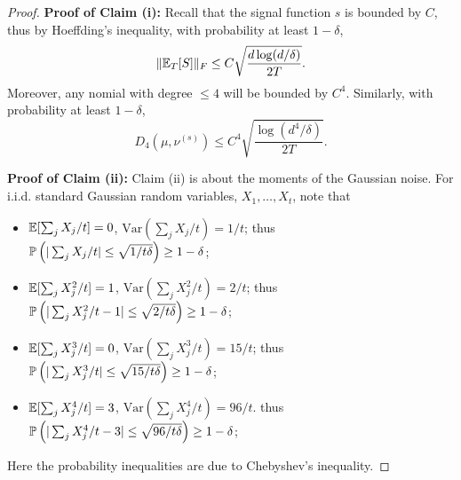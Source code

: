 \begin{proof}
	\vspace{5mm}
	{\bf Proof of Claim (i):} 
	Recall that the signal function $s$ is bounded by $C$, thus by Hoeffding's inequality, with probability at least $1-\delta$, 
	\begin{equation}
	\label{eq:A1claim1a}
	\| \mathbb{E}_T[S] \|_F \le C\sqrt{\frac{d\log(d/\delta)}{2T}}.
	\end{equation} 
	Moreover, any nomial with degree $\le 4$ will be bounded by $C^4$. Similarly, with probability at least $1-\delta$, 
	\begin{equation}
	\label{eq:A1claim1b}
	D_4(\mu, \nu^{(s)}) \le  C^4\sqrt{\frac{\log(d^4/\delta)}{2T}}.
	\end{equation}
	
	\vspace{5mm}
	{\bf Proof of Claim (ii):} 
	Claim (ii) is about the moments of the Gaussian noise. 
	For i.i.d. standard Gaussian random variables, $X_1, \ldots, X_t$, note that
	\begin{itemize}
		\itemsep0em
		\item $ \mathbb{E}[\sum_j X_j/t] = 0$, $\text{Var}(\sum_j X_j/t) = 1/t$; thus  $\mathbb{P}\left( |\sum_j X_j/t| \le \sqrt{1/t\delta} \right) \ge 1-\delta$;
		\item $ \mathbb{E}[\sum_j X_j^2/t] = 1$, $\text{Var}(\sum_j X_j^2/t) = 2/t$; thus  $\mathbb{P}\left( |\sum_j X_j^2/t -1 | \le \sqrt{2/t\delta} \right) \ge 1-\delta$;
		\item $ \mathbb{E}[\sum_j X_j^3/t] = 0$, $\text{Var}(\sum_j X_j^3/t) = 15/t$; thus  $\mathbb{P}\left( |\sum_j X_j^3/t| \le \sqrt{15/t\delta} \right) \ge 1-\delta$;
		\item $ \mathbb{E}[\sum_j X_j^4/t] = 3$, $\text{Var}(\sum_j X_j^4/t) = 96/t$. thus  $\mathbb{P}\left( |\sum_j X_j^4/t -3| \le \sqrt{96/t\delta} \right) \ge 1-\delta$;
	\end{itemize}
	Here the probability inequalities are due to Chebyshev's inequality.
	

\end{proof}
